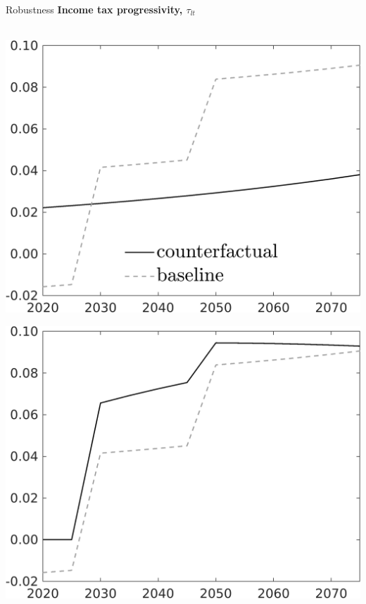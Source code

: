 \documentclass[11pt,aspectratio=169]{beamer}
\begin{document}
\begin{frame}{Robustness}
	\hypertarget{robustness}{}
	\centering \textbf{Income tax progressivity, $\tau_{lt}$}\\ \ \\
	\begin{minipage}[]{0.3\textwidth}
		\includegraphics[width=1\textwidth]{../codding_model/own_basedOnFried/optimalPol_elastS_DisuSci/figures/all_1705/SingleROB_extern_OPT_T_NoTaus_taul_spillover0_noskill0_sep1_BN0_ineq0_red0_etaa0.79_lgd1.png}
	\end{minipage}
	\begin{minipage}[]{0.3\textwidth}
		\includegraphics[width=1\textwidth]{../codding_model/own_basedOnFried/optimalPol_elastS_DisuSci/figures/all_1705/SingleROB_xgrowth_OPT_T_NoTaus_taul_spillover0_noskill0_sep1_BN0_ineq0_red0_etaa0.79_lgd0.png}

\end{minipage}
\end{frame}
\end{document}
